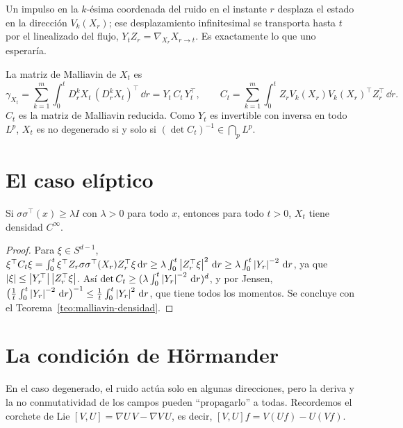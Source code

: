 \begin{intuicion}
Un impulso en la $k$-ésima coordenada del ruido en el instante $r$ desplaza el estado en la
dirección $V_k(X_r)$; ese desplazamiento infinitesimal se transporta hasta $t$ por el linealizado
del flujo, $Y_tZ_r=\nabla_{X_r}X_{r\to t}$. Es exactamente lo que uno esperaría.
\end{intuicion}

\begin{corolario}\label{cor:matriz-malliavin}
La matriz de Malliavin de $X_t$ es
\[
  \gamma_{X_t}=\sum_{k=1}^m\int_0^tD^k_rX_t\,(D^k_rX_t)^\top\,\dd r=Y_t\,C_t\,Y_t^\top,\qquad C_t=\sum_{k=1}^m\int_0^tZ_rV_k(X_r)V_k(X_r)^\top Z_r^\top\,\dd r.
\]
$C_t$ es la \textup{matriz de Malliavin reducida}. Como $Y_t$ es invertible con inversa en todo $L^p$, $X_t$ es no
degenerado si y solo si $(\det C_t)^{-1}\in\bigcap_pL^p$.
\end{corolario}

\section{El caso elíptico}

\begin{teorema}
Si $\sigma\sigma^\top(x)\ge\lambda I$ con $\lambda>0$ para todo $x$, entonces para todo $t>0$, $X_t$ tiene
densidad $C^\infty$.
\end{teorema}

\begin{proof}
Para $\xi\in S^{d-1}$, $\xi^\top C_t\xi=\int_0^t\xi^\top Z_r\sigma\sigma^\top(X_r)Z_r^\top\xi\,\mathrm{d} r\ge\lambda\int_0^t\left\lvert Z_r^\top\xi\right\rvert^2\,\mathrm{d} r\ge
\lambda\int_0^t\left\lvert Y_r\right\rvert^{-2}\,\mathrm{d} r$, ya que $\left\lvert \xi\right\rvert\le\left\lvert Y_r^\top\right\rvert\left\lvert Z_r^\top\xi\right\rvert$. Así $\det C_t\ge(\lambda\int_0^t\left\lvert Y_r\right\rvert^{-2}\,\mathrm{d} r)^d$, y por Jensen,
$\big(\frac1t\int_0^t\left\lvert Y_r\right\rvert^{-2}\,\mathrm{d} r\big)^{-1}\le\frac1t\int_0^t\left\lvert Y_r\right\rvert^2\,\mathrm{d} r$, que tiene todos los momentos. Se concluye con el
Teorema~\ref{teo:malliavin-densidad}.
\end{proof}

\section{La condición de Hörmander}
En el caso degenerado, el ruido actúa solo en algunas direcciones, pero la deriva y la no
conmutatividad de los campos pueden ``propagarlo'' a todas. Recordemos el corchete de Lie
$[V,U]=\nabla U\,V-\nabla V\,U$, es decir, $[V,U]f=V(Uf)-U(Vf)$.


